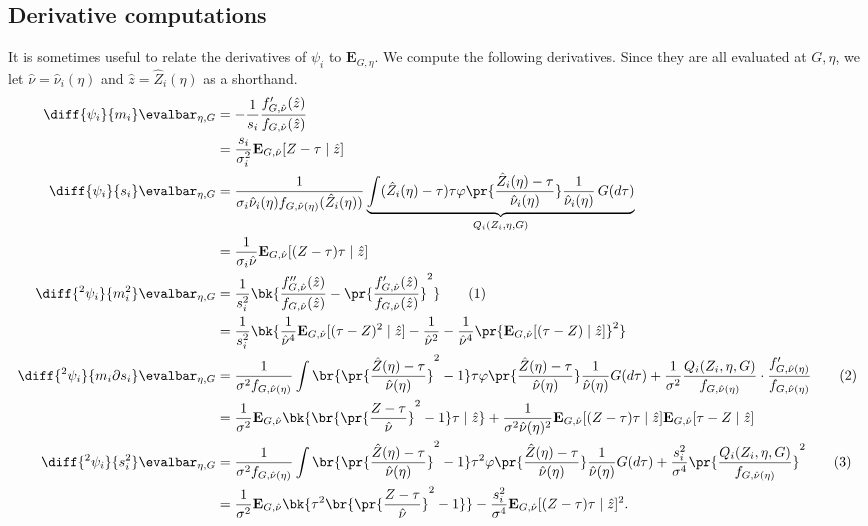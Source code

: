 \documentclass[12pt, reqno]{amsart}
\newcommand\numberthis{\addtocounter{equation}{1}\tag{\theequation}}
\newcommand{\PE}{\mathbf{E}}
\numberwithin{equation}{section}
\begin{document}
\begin{refsection}
\begin{appendices}
\subsection{Derivative computations}
\label{sub:derivatives} 
It is sometimes useful to relate the derivatives of $\psi_i$ to
 $\PE_{G, \eta}$. We compute the following derivatives. Since they are all evaluated at
 $G, \eta$, we let $\hat
\nu = \hat\nu_i(\eta)$ and $\hat z = \hat Z_i(\eta)$ as a shorthand.
\begin{align}
\diff{\psi_i}{m_i}\evalbar_{\eta, G} &= -\frac{1}{s_i} \frac{f'_{G, \hat\nu}(\hat z)}{f_
{G,
\hat\nu} (\hat z)} \\
&= \frac{s_i}{\sigma_i^2} \PE_{G, \hat\nu}[Z-\tau
\mid \hat z] \label{eq:dpsidm}
\\
\diff{\psi_i
}{s_i} \evalbar_{{\eta, G}} &= \frac{1}{\sigma_i \hat\nu_i(\eta) f_{G,
\hat\nu(\eta)}(\hat Z_i(\eta))} \underbrace{\int (\hat Z_i(\eta) - \tau) \tau \varphi\pr{
\frac{\hat
Z_i(\eta) - \tau}{\hat \nu_i(\eta)}} \frac{1}{\hat \nu_i(\eta)} \,G(d\tau)}_{Q_i(Z_i,
\eta, G)}\label{eq:dpsids} \\
&= \frac{1}{\sigma_i \hat \nu} \PE_{G, \hat\nu}[(Z-\tau)\tau \mid \hat z]
\\
\diff{^2\psi_i}{m_i^2} \evalbar_{\eta, G}
&= \frac{1}{s^2_i} \bk{\frac{f''_{G,\hat\nu}(\hat z)}{f_{G,\hat\nu}(\hat z)} -
\pr{\frac{f'_{G,\hat\nu}(\hat z)}{f_{G,\hat\nu}(\hat z)}}^2}
\numberthis \label{eq:d2psidm2} \\
&= \frac{1}{s_i^2} \bk{
    \frac{1}{\hat\nu^4} \PE_{G,\hat\nu}[(\tau-Z)^2 \mid \hat z] - \frac{1}{\hat\nu^2} -
    \frac{1}{\hat\nu^4} \pr{\PE_{G, \hat\nu} [(\tau-Z) \mid \hat z]}^2
}
\\
\diff{^2 \psi_i}{m_i \partial s_i} \evalbar_{\eta, G}
&= 
\frac{1}{\sigma^2  f_{G, \hat \nu(\eta)} } \int \br{\pr{\frac{\hat Z(\eta) - \tau}
{\hat\nu(\eta)}}^2 - 1 } \tau \varphi\pr{\frac{\hat Z(\eta) - \tau}
{\hat\nu(\eta)}} \frac{1}{\hat\nu(\eta)} G(d\tau) + \frac{1}{\sigma^2} \frac{Q_i(Z_i,
\eta, G)} {f_{G, \hat \nu(\eta)} } \cdot \frac{f'_{G, \hat \nu(\eta)}}{f_{G, \hat \nu(\eta)}}
\numberthis \label{eq:cross_psi_deriv}
\\
&=\frac{1}{\sigma^2} \PE_{G, \hat\nu} \bk{\br{\pr{\frac{Z-\tau}{\hat\nu}}^2 - 1} \tau \mid
 \hat z} +
\frac{1}{\sigma^2\hat \nu(\eta)^2} \PE_{G, \hat\nu}[(Z-\tau)\tau \mid \hat z] \PE_{G, \hat\nu}[\tau-Z \mid \hat
z]
\\
\diff{^2 \psi_i}{s_i^2} \evalbar_{\eta, G}
&= 
\frac{1}{\sigma^2 f_{G, \hat \nu(\eta)}} \int \br{\pr{\frac{\hat Z(\eta) - \tau}
{\hat\nu(\eta)}}^2 - 1 }
\tau^2 \varphi\pr{\frac{\hat Z(\eta) - \tau}
{\hat\nu(\eta)}} \frac{1}{\hat\nu(\eta)} G(d\tau) + \frac{s_i^2} {\sigma^4} \pr{\frac{Q_i
(Z_i, \eta, G)}{f_{G, \hat \nu(\eta)}}}^2
 \numberthis 
 \label{eq:d2psids2} \\
 &=\frac{1}{\sigma^2} \PE_{G, \hat\nu} \bk{
 \tau^2 \br{\pr{\frac{Z-\tau}{\hat\nu}}^2 - 1}
 } - \frac{s_i^2}{\sigma^4} \PE_{G, \hat\nu} [(Z -\tau)\tau \mid \hat z]^2.
\end{align}


\end{appendices}
\end{refsection}
\end{document}
